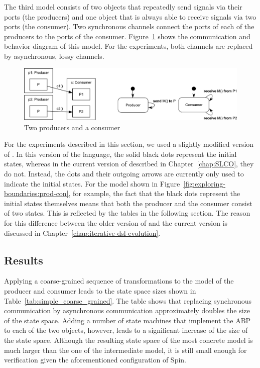 The third model consists of two objects that repeatedly send signals via their ports (the producers) and one object that is always able to receive signals via two ports (the consumer).
Two synchronous channels connect the ports of each of the producers to the ports of the consumer.
Figure~\ref{fig:exploring-boundaries:prods-con} shows the communication and behavior diagram of this model.
For the experiments, both channels are replaced by asynchronous, lossy channels.

\begin{figure}[hbt]
  \centering
  \includegraphics[scale=0.45]{exploring-boundaries/figs/producers-consumer}
  \caption{Two producers and a consumer}
  \label{fig:exploring-boundaries:prods-con}
\end{figure}

For the experiments described in this section, we used a slightly modified version of \SLCO.
In this version of the language, the solid black dots represent the initial states, whereas in the current version of \SLCO described in Chapter~\ref{chap:SLCO}, they do not.
Instead, the dots and their outgoing arrows are currently only used to indicate the initial states.
For the model shown in Figure~\ref{fig:exploring-boundaries:prod-con}, for example, the fact that the black dots represent the initial states themselves means that both the producer and the consumer consist of two states.
This is reflected by the tables in the following section.
The reason for this difference between the older version of \SLCO and the current version is discussed in Chapter~\ref{chap:iterative-dsl-evolution}.

\subsection{Results}
\label{subsec:exploring-boundaries:results}
Applying a coarse-grained sequence of transformations to the model of the producer and consumer leads to the state space sizes shown in Table~\ref{tab:simple_coarse_grained}.
The table shows that replacing synchronous communication by asynchronous communication approximately doubles the size of the state space.
Adding a number of state machines that implement the ABP to each of the two objects, however, leads to a significant increase of the size of the state space.
Although the resulting state space of the most concrete model is much larger than the one of the intermediate model, it is still small enough for verification given the aforementioned configuration of Spin.

